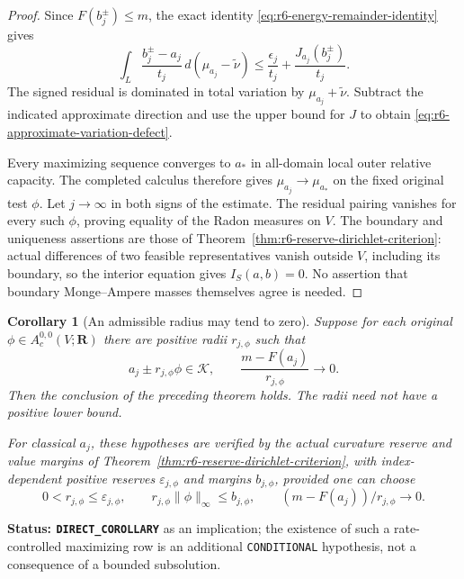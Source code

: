 \documentclass[11pt,a4paper]{article}
\numberwithin{equation}{section}
\newtheorem{corollary}[theorem]{Corollary}
\theoremstyle{definition}
\theoremstyle{remark}
\begin{document}
\begin{proof}
Since $F(b_j^\pm)\le m$, the exact identity
\eqref{eq:r6-energy-remainder-identity} gives
\[
 \int_L\frac{b_j^\pm-a_j}{t_j}
                 \,d(\mu_{a_j}-\widetilde\nu)
       \le \frac{\epsilon_j}{t_j}+\frac{J_{a_j}(b_j^\pm)}{t_j}.
\]
The signed residual is dominated in total variation by
$\mu_{a_j}+\widetilde\nu$. Subtract the indicated approximate
direction and use the upper bound for $J$ to obtain
\eqref{eq:r6-approximate-variation-defect}.

Every maximizing sequence converges to $a_*$ in all-domain local outer
relative capacity. The completed calculus therefore gives
$\mu_{a_j}\to\mu_{a_*}$ on the fixed original test $\phi$.
Let $j\to\infty$ in both signs of the estimate. The residual pairing
vanishes for every such $\phi$, proving equality of the Radon measures
on $V$. The boundary and uniqueness assertions are those of
Theorem~\ref{thm:r6-reserve-dirichlet-criterion}: actual differences of
two feasible representatives vanish outside $V$, including its
boundary, so the interior equation gives $I_S(a,b)=0$. No assertion
that boundary Monge--Ampere masses themselves agree is needed.
\end{proof}

\begin{corollary}[An admissible radius may tend to zero]
\label{cor:r6-vanishing-reserve-dirichlet}
Suppose for each original $\phi\in A_c^{0,0}(V;\mathbf R)$ there are
positive radii $r_{j,\phi}$ such that
\[
                  a_j\pm r_{j,\phi}\phi\in\mathscr K,
          \qquad \frac{m-F(a_j)}{r_{j,\phi}}\longrightarrow0.
\]
Then the conclusion of the preceding theorem holds. The radii need not
have a positive lower bound.

For classical $a_j$, these hypotheses are verified by the actual
curvature reserve and value margins of
Theorem~\ref{thm:r6-reserve-dirichlet-criterion}, with index-dependent
positive reserves $\varepsilon_{j,\phi}$ and margins $b_{j,\phi}$,
provided one can choose
\[
 0<r_{j,\phi}\le\varepsilon_{j,\phi},\qquad
 r_{j,\phi}\|\phi\|_\infty\le b_{j,\phi},\qquad
 (m-F(a_j))/r_{j,\phi}\longrightarrow0.
\]
\end{corollary}

\noindent\textbf{Status: \texttt{DIRECT\_COROLLARY}} as an implication;
the existence of such a rate-controlled maximizing row is an additional
\texttt{CONDITIONAL} hypothesis, not a consequence of a bounded
subsolution.
\end{document}
